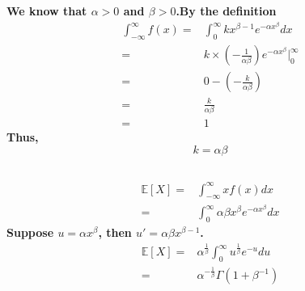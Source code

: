\documentclass{article}
\begin{document}
    \section{}
        \subsection{}
            \paragraph{We know that $\alpha>0$ and $\beta>0$.By the definition
                \begin{equation*}
                    \begin{split}
                        \int _{-\infty} ^{\infty}f(x)=&\int _0 ^\infty kx^{\beta-1}e^{-\alpha x^\beta}dx\\
                            =&k\times (-\frac{1}{\alpha\beta})e^{-\alpha x^\beta}|_0^\infty\\
                            =&0-(-\frac{k}{\alpha\beta})\\
                            =&\frac{k}{\alpha\beta}\\
                            =&1
                    \end{split}
                \end{equation*}
                Thus,$$k=\alpha\beta$$
            }

        \subsection{}
            \paragraph{
                \begin{equation*}
                    \begin{split}
                        \mathbb{E}[X]=&\int_{-\infty} ^\infty xf(x)dx\\
                            =&\int _0 ^\infty \alpha\beta x^\beta e^{-\alpha x^\beta}dx
                    \end{split}
                \end{equation*}
                Suppose $u=\alpha x^\beta$, then $u'=\alpha\beta x^{\beta-1}$.
                \begin{equation*}
                    \begin{split}
                        \mathbb{E}[X]=&\alpha^{\frac{1}{\beta}}\int _0 ^\infty u^\frac{1}{\beta}e^{-u}du\\
                        =&\alpha^{-\frac{1}{\beta}}\Gamma(1+\beta^{-1})\\
                    \end{split}
                \end{equation*}
            }
\end{document}
